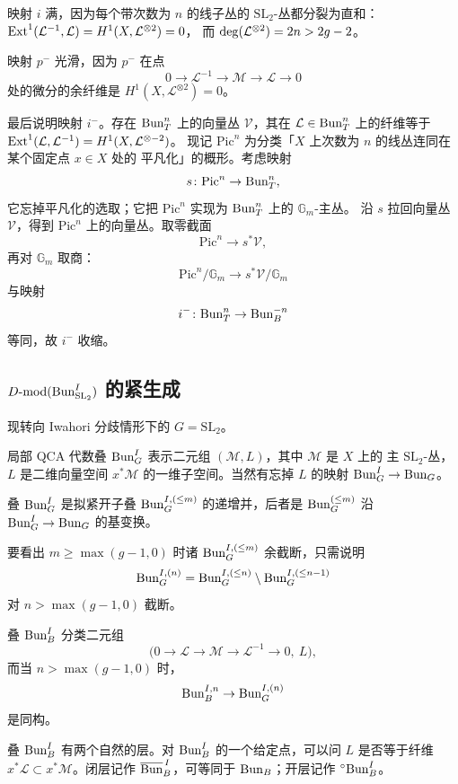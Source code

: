 映射 $i$ 满，因为每个带次数为 $n$ 的线子丛的 $\mathrm{SL}_2$-丛都分裂为直和：
$\operatorname{Ext}^1(\mathcal{L}^{-1},\mathcal{L})=H^1(X,\mathcal{L}^{\otimes 2})=0$，
而 $\operatorname{deg}(\mathcal{L}^{\otimes 2})=2n>2g-2$。

映射 $p^-$ 光滑，因为 $p^-$ 在点
\[
0\to \mathcal{L}^{-1}\to \mathcal{M}\to \mathcal{L}\to 0
\]
处的微分的余纤维是 $H^1(X,\mathcal{L}^{\otimes 2})=0$。

最后说明映射 $i^-$。存在 $\mathrm{Bun}^n_T$ 上的向量丛 $\mathcal{V}$，其在
$\mathcal{L}\in \mathrm{Bun}^n_T$ 上的纤维等于
$\operatorname{Ext}^1(\mathcal{L},\mathcal{L}^{-1})=H^1(X,\mathcal{L}^{\otimes -2})$。
现记 $\mathrm{Pic}^n$ 为分类「$X$ 上次数为 $n$ 的线丛连同在某个固定点 $x\in X$ 处的
平凡化」的概形。考虑映射
\[
s\colon \mathrm{Pic}^n\to \mathrm{Bun}^n_T,
\]
它忘掉平凡化的选取；它把 $\mathrm{Pic}^n$ 实现为 $\mathrm{Bun}^n_T$ 上的 $\mathbb{G}_m$-主丛。
沿 $s$ 拉回向量丛 $\mathcal{V}$，得到 $\mathrm{Pic}^n$ 上的向量丛。取零截面
\[
\mathrm{Pic}^n\to s^*\mathcal{V},
\]
再对 $\mathbb{G}_m$ 取商：
\[
\mathrm{Pic}^n/\mathbb{G}_m\to s^*\mathcal{V}/\mathbb{G}_m
\]
与映射
\[
i^-\colon \mathrm{Bun}^n_T\to \mathrm{Bun}^{-n}_B
\]
等同，故 $i^-$ 收缩。

\subsection{\texorpdfstring{$D\text{-}\mathrm{mod}(\mathrm{Bun}^{I}_{\mathrm{SL}_2})$ 的紧生成}{D-mod(ISL2) 的紧生成}}
\label{sec:sl2-iwahori}

现转向 Iwahori 分歧情形下的 $G=\mathrm{SL}_2$。

局部 QCA 代数叠 $\mathrm{Bun}^I_G$ 表示二元组 $(\mathcal{M},L)$，其中 $\mathcal{M}$ 是 $X$ 上的
主 $\mathrm{SL}_2$-丛，$L$ 是二维向量空间 $x^*\mathcal{M}$ 的一维子空间。当然有忘掉 $L$
的映射 $\mathrm{Bun}^I_G\to \mathrm{Bun}_G$。

叠 $\mathrm{Bun}^I_G$ 是拟紧开子叠 $\mathrm{Bun}^{I,(\le m)}_G$ 的递增并，后者是
$\mathrm{Bun}^{(\le m)}_G$ 沿 $\mathrm{Bun}^I_G\to \mathrm{Bun}_G$ 的基变换。

要看出 $m\ge\max(g-1,0)$ 时诸 $\mathrm{Bun}^{I,(\le m)}_G$ 余截断，只需说明
\[
\mathrm{Bun}^{I,(n)}_G=\mathrm{Bun}^{I,(\le n)}_G\setminus \mathrm{Bun}^{I,(\le n-1)}_G
\]
对 $n>\max(g-1,0)$ 截断。

叠 $\mathrm{Bun}^I_B$ 分类二元组
\[
\bigl(0\to \mathcal{L}\to \mathcal{M}\to \mathcal{L}^{-1}\to 0,\ L\bigr),
\]
而当 $n>\max(g-1,0)$ 时，
\[
\mathrm{Bun}^{I,n}_B\to \mathrm{Bun}^{I,(n)}_G
\]
是同构。

叠 $\mathrm{Bun}^I_B$ 有两个自然的层。对 $\mathrm{Bun}^I_B$ 的一个给定点，可以问 $L$ 是否等于纤维
$x^*\mathcal{L}\subset x^*\mathcal{M}$。闭层记作 $\overline{\mathrm{Bun}}^{\,I}_B$，可等同于
$\mathrm{Bun}_B$；开层记作 ${}^{\circ}\mathrm{Bun}^{I}_B$。


